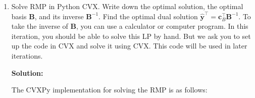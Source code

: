 \documentclass[11pt]{article}
\newcommand{\mb}[1]{\ensuremath{\boldsymbol{#1}}}
\begin{document}
\begin{enumerate}
\begin{enumerate}
Solving by hand:
\begin{align*}
x_1 &= \frac{25}{5} = 5 \\
x_2 &= \frac{15}{2} = 7.5 \\
x_3 &= \frac{10}{2} = 5
\end{align*}

Since we have 3 variables and 3 constraints, all variables are basic variables. Therefore, the optimal basis matrix $\mb{B}$ is:
$$\mb{B} = \begin{bmatrix} 5 & 0 & 0 \\ 0 & 2 & 0 \\ 0 & 0 & 2 \end{bmatrix}$$

The inverse of the basis matrix $\mb{B}^{-1}$ is:
$$\mb{B}^{-1} = \begin{bmatrix} \frac{1}{5} & 0 & 0 \\ 0 & \frac{1}{2} & 0 \\ 0 & 0 & \frac{1}{2} \end{bmatrix}$$

The optimal dual solution is:
$$\hat{\mb{y}}^\top = \mb{c}_B^\top\mb{B}^{-1} = \begin{bmatrix} 1 & 1 & 1 \end{bmatrix} \begin{bmatrix} \frac{1}{5} & 0 & 0 \\ 0 & \frac{1}{2} & 0 \\ 0 & 0 & \frac{1}{2} \end{bmatrix} = \begin{bmatrix} \frac{1}{5} & \frac{1}{2} & \frac{1}{2} \end{bmatrix}$$

Therefore, $\hat{\mb{y}} = \begin{bmatrix} 0.2 & 0.5 & 0.5 \end{bmatrix}^\top$.


\item Solve RMP in Python CVX. Write down the optimal solution, the optimal basis
$\mb{B}$, and its inverse $\mb{B}^{-1}$. Find the optimal dual solution $\hat{\mb{y}}^\top=\mb{c}_B^\top\mb{B}^{-1}$. To take the inverse
of $\mb{B}$, you can use a calculator or computer program. In this iteration, you should be able to solve this LP by hand. But we ask you to set up the code in CVX and solve it using CVX. This code will be used in later iterations.

\textbf{Solution:}

The CVXPy implementation for solving the RMP is as follows:


\end{enumerate}
\end{enumerate}
\end{document}

